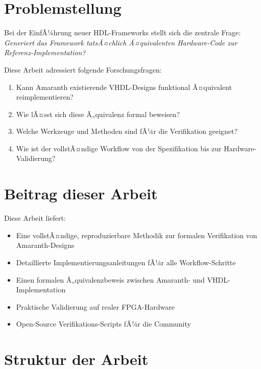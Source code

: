﻿\documentclass[12pt,a4paper]{report}
\begin{document}
\section{Problemstellung}

Bei der EinfÃ¼hrung neuer HDL-Frameworks stellt sich die zentrale Frage: \textit{Generiert das Framework tatsÃ¤chlich Ã¤quivalenten Hardware-Code zur Referenz-Implementation?}

Diese Arbeit adressiert folgende Forschungsfragen:

\begin{enumerate}
    \item Kann Amaranth existierende VHDL-Designs funktional Ã¤quivalent reimplementieren?
    \item Wie lÃ¤sst sich diese Ã„quivalenz formal beweisen?
    \item Welche Werkzeuge und Methoden sind fÃ¼r die Verifikation geeignet?
    \item Wie ist der vollstÃ¤ndige Workflow von der Spezifikation bis zur Hardware-Validierung?
\end{enumerate}

\section{Beitrag dieser Arbeit}

Diese Arbeit liefert:

\begin{itemize}
    \item Eine vollstÃ¤ndige, reproduzierbare Methodik zur formalen Verifikation von Amaranth-Designs
    \item Detaillierte Implementierungsanleitungen fÃ¼r alle Workflow-Schritte
    \item Einen formalen Ã„quivalenzbeweis zwischen Amaranth- und VHDL-Implementation
    \item Praktische Validierung auf realer FPGA-Hardware
    \item Open-Source Verifikations-Scripts fÃ¼r die Community
\end{itemize}

\section{Struktur der Arbeit}
\end{document}
